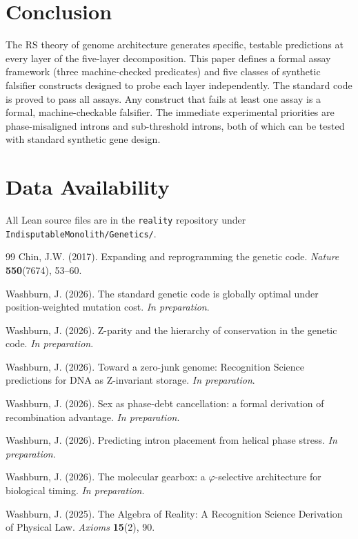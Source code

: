 \documentclass[11pt,twocolumn]{article}
\begin{document}
\section{Conclusion}

The RS theory of genome architecture generates specific, testable
predictions at every layer of the five-layer decomposition. This paper
defines a formal assay framework (three machine-checked predicates) and
five classes of synthetic falsifier constructs designed to probe each
layer independently. The standard code is proved to pass all assays. Any
construct that fails at least one assay is a formal, machine-checkable
falsifier. The immediate experimental priorities are phase-misaligned
introns and sub-threshold introns, both of which can be tested with
standard synthetic gene design.

\section*{Data Availability}

All Lean source files are in the \texttt{reality} repository under
\texttt{IndisputableMonolith/Genetics/}.

\begin{thebibliography}{99}
Chin, J.W. (2017). Expanding and reprogramming the genetic code.
\textit{Nature} \textbf{550}(7674), 53--60.

Washburn, J. (2026). The standard genetic code is globally optimal under
position-weighted mutation cost. \textit{In preparation}.

Washburn, J. (2026). Z-parity and the hierarchy of conservation in the
genetic code. \textit{In preparation}.

Washburn, J. (2026). Toward a zero-junk genome: Recognition Science
predictions for DNA as Z-invariant storage. \textit{In preparation}.

Washburn, J. (2026). Sex as phase-debt cancellation: a formal derivation
of recombination advantage. \textit{In preparation}.

Washburn, J. (2026). Predicting intron placement from helical phase
stress. \textit{In preparation}.

Washburn, J. (2026). The molecular gearbox: a $\varphi$-selective
architecture for biological timing. \textit{In preparation}.

Washburn, J. (2025). The Algebra of Reality: A Recognition Science
Derivation of Physical Law. \textit{Axioms} \textbf{15}(2), 90.
\end{thebibliography}
\end{document}

